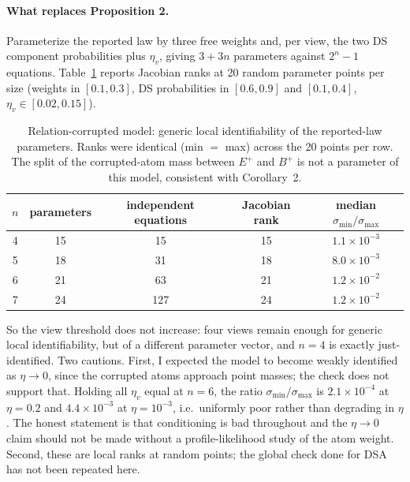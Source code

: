 \documentclass[11pt]{article}
\theoremstyle{remark}
\begin{document}
\paragraph{What replaces Proposition 2.} Parameterize the reported law by three free weights and, per view, the two DS component probabilities plus $\eta_v$, giving $3+3n$ parameters against $2^n-1$ equations. Table~\ref{tab:corr} reports Jacobian ranks at 20 random parameter points per size (weights in $[0.1,0.3]$, DS probabilities in $[0.6,0.9]$ and $[0.1,0.4]$, $\eta_v\in[0.02,0.15]$).

\begin{table}[h]
\centering\small
\begin{tabular}{@{}ccccc@{}}
\toprule
$n$ & parameters & independent equations & Jacobian rank & median $\sigma_{\min}/\sigma_{\max}$\\
\midrule
4 & 15 & 15 & 15 & $1.1\times10^{-3}$\\
5 & 18 & 31 & 18 & $8.0\times10^{-3}$\\
6 & 21 & 63 & 21 & $1.2\times10^{-2}$\\
7 & 24 & 127 & 24 & $1.2\times10^{-2}$\\
\bottomrule
\end{tabular}
\caption{Relation-corrupted model: generic local identifiability of the reported-law parameters. Ranks were identical (min $=$ max) across the 20 points per row. The split of the corrupted-atom mass between $E^+$ and $B^+$ is not a parameter of this model, consistent with Corollary~2.}
\label{tab:corr}
\end{table}

So the view threshold does not increase: four views remain enough for generic local identifiability, but of a different parameter vector, and $n=4$ is exactly just-identified. Two cautions. First, I expected the model to become weakly identified as $\eta\to0$, since the corrupted atoms approach point masses; the check does not support that. Holding all $\eta_v$ equal at $n=6$, the ratio $\sigma_{\min}/\sigma_{\max}$ is $2.1\times10^{-4}$ at $\eta=0.2$ and $4.4\times10^{-3}$ at $\eta=10^{-3}$, i.e.\ uniformly poor rather than degrading in $\eta$. The honest statement is that conditioning is bad throughout and the $\eta\to0$ claim should not be made without a profile-likelihood study of the atom weight. Second, these are local ranks at random points; the global check done for DSA has not been repeated here.

\end{document}
